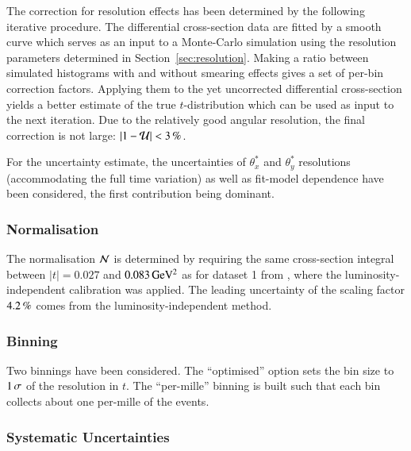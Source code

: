 The correction for resolution effects has been determined by the following iterative procedure. The differential cross-section data are fitted by a smooth curve which serves as an input to a Monte-Carlo simulation using the resolution parameters determined in Section~\ref{sec:resolution}. Making a ratio between simulated histograms with and without smearing effects gives a set of per-bin correction factors. Applying them to the yet uncorrected differential cross-section yields a better estimate of the true $t$-distribution which can be used as input to the next iteration. Due to the relatively good angular resolution, the final correction is not large: $|1 - {\cal U}| < 3\,{\rm \%}$.

For the uncertainty estimate, the uncertainties of $\theta_x^*$ and $\theta_y^*$ resolutions (accommodating the full time variation) as well as fit-model dependence have been considered, the first contribution being dominant.




\subsubsection{Normalisation}
\label{sec:normalisation}

The normalisation ${\cal N}$ is determined by requiring the same cross-section integral between $|t| = 0.027$ and $0.083\,{\rm GeV^2}$ as for dataset 1 from \cite{prl111}, where the luminosity-independent calibration was applied. The leading uncertainty of the scaling factor $4.2\,{\rm \%}$ comes from the luminosity-independent %
method.




\subsubsection{Binning}
\label{sec:binning}

Two binnings have been considered. The ``optimised'' option sets the bin size to $1\,{\rm \sigma}$ of the resolution in $t$. The ``per-mille'' binning is built such that each bin collects about one per-mille of the events.



\subsubsection{Systematic Uncertainties}
\label{sec:systematics}

